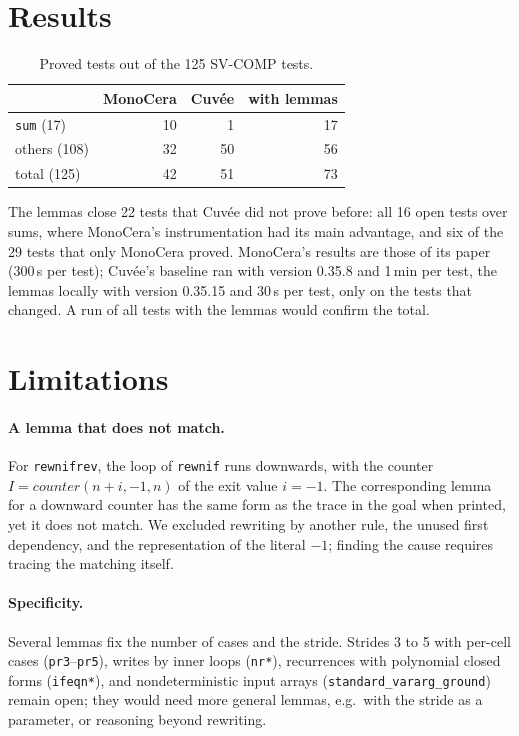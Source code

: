 \documentclass[sigconf,nonacm]{acmart}
\newcommand{\cuvee}{Cuv\'ee}
\newcommand{\code}[1]{\texttt{#1}}
\begin{document}
\section{Results}

\begin{table}[h]
\caption{Proved tests out of the 125 SV-COMP tests.}
\begin{tabular}{lrrr}
\toprule
 & MonoCera & \cuvee{} & with lemmas \\
\midrule
\code{sum} (17) & 10 & 1 & 17 \\
others (108) & 32 & 50 & 56 \\
\midrule
total (125) & 42 & 51 & 73 \\
\bottomrule
\end{tabular}
\end{table}

The lemmas close 22 tests that \cuvee{} did not prove before: all 16 open
tests over sums, where MonoCera's instrumentation had its main advantage, and
six of the 29 tests that only MonoCera proved. MonoCera's results are those of
its paper (300\,s per test); \cuvee{}'s baseline ran with version 0.35.8 and
1\,min per test, the lemmas locally with version 0.35.15 and 30\,s per test,
only on the tests that changed. A run of all tests with the lemmas would
confirm the total.

\section{Limitations}

\paragraph{A lemma that does not match.} For \code{rewnifrev}, the loop of
\code{rewnif} runs downwards, with the counter
$I = \mathit{counter}(n + i, -1, n)$ of the exit value $i = -1$. The
corresponding lemma for a downward counter has the same form as the trace in
the goal when printed, yet it does not match. We excluded rewriting by
another rule, the unused first dependency, and the representation of the
literal $-1$; finding the cause requires tracing the matching itself.

\paragraph{Specificity.} Several lemmas fix the number of cases and the
stride. Strides 3 to 5 with per-cell cases (\code{pr3}--\code{pr5}), writes by
inner loops (\code{nr*}), recurrences with polynomial closed forms
(\code{ifeqn*}), and nondeterministic input arrays
(\code{standard\_vararg\_ground}) remain open; they would need more general
lemmas, e.g.\ with the stride as a parameter, or reasoning beyond rewriting.
\end{document}

